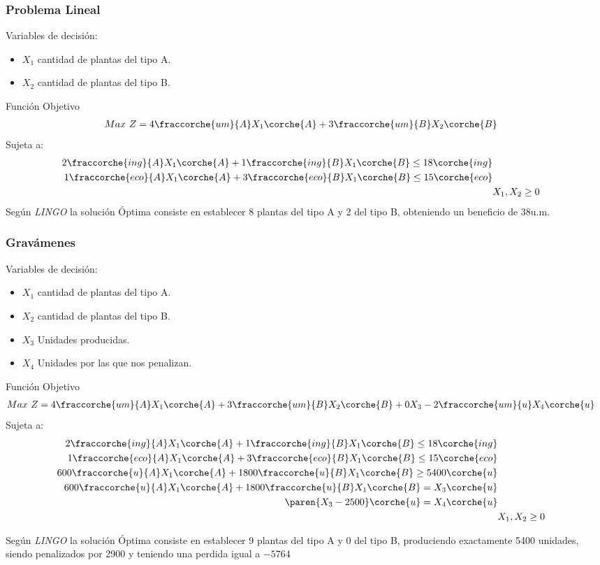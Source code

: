 

\begin{homeworkProblem}[-1][Compañía]
\subsubsection{Problema Lineal}
Variables de decisión:
\begin{itemize}
    \item $X_1$ cantidad de plantas del tipo A.
    \item $X_2$ cantidad de plantas del tipo B.
\end{itemize}
Función Objetivo
\begin{align*}
   Max\ Z = 4\fraccorche{um}{A}&X_1\corche{A} + 3\fraccorche{um}{B}X_2\corche{B} 
\end{align*}
Sujeta a:
\begin{align*}
    2\fraccorche{ing}{A}X_1\corche{A} + 1\fraccorche{ing}{B}X_1\corche{B} \leq 18\corche{ing} \\
    1\fraccorche{eco}{A}X_1\corche{A} + 3\fraccorche{eco}{B}X_1\corche{B} \leq 15\corche{eco} \\
    &X_1,X_2\geq 0
\end{align*}
Según \textit{LINGO} la solución Óptima consiste en establecer 8 plantas del tipo A y 2 del tipo B, obteniendo un beneficio de 38u.m.


\subsubsection{Gravámenes}
Variables de decisión:
\begin{itemize}
    \item $X_1$ cantidad de plantas del tipo A.
    \item $X_2$ cantidad de plantas del tipo B.
    \item $X_3$ Unidades producidas.
    \item $X_4$ Unidades por las que nos penalizan.
\end{itemize}
Función Objetivo
\begin{align*}
   Max\ Z = 4\fraccorche{um}{A}&X_1\corche{A} + 3\fraccorche{um}{B}X_2\corche{B} + 0X_3 - 2\fraccorche{um}{u}X_4\corche{u}
\end{align*}
Sujeta a:
\begin{align*}
    2\fraccorche{ing}{A}X_1\corche{A} + 1\fraccorche{ing}{B}X_1\corche{B} \leq 18\corche{ing} \\
    1\fraccorche{eco}{A}X_1\corche{A} + 3\fraccorche{eco}{B}X_1\corche{B} \leq 15\corche{eco} \\
    600\fraccorche{u}{A}X_1\corche{A} + 1800\fraccorche{u}{B}X_1\corche{B} \geq 5400\corche{u} \\
    600\fraccorche{u}{A}X_1\corche{A} + 1800\fraccorche{u}{B}X_1\corche{B} = X_3\corche{u} \\
    \paren{X_3 - 2500}\corche{u} = X_4\corche{u} \\
    &X_1,X_2\geq 0
\end{align*}

Según \textit{LINGO} la solución Óptima consiste en establecer 9 plantas del tipo A y 0 del tipo B, produciendo exactamente 5400 unidades, siendo penalizados por 2900 y teniendo una perdida igual a $-5764$

\end{homeworkProblem}


